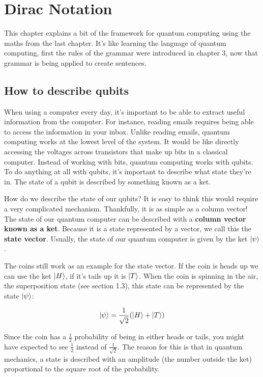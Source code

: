 \chapter{Dirac Notation}

This chapter explains a bit of the framework for quantum computing using the maths from the last chapter. It's like learning the language of quantum computing, first the rules of the grammar were introduced in chapter 3, now that grammar is being applied to create sentences. 

\section{ How to describe qubits}

When using a computer every day, it's important to be able to extract useful information from the computer. For instance, reading emails requires being able to access the information in your inbox. Unlike reading emails, quantum computing works at the lowest level of the system. It would be like directly accessing the voltages across transistors that make up bits in a classical computer. Instead of working with bits, quantum computing works with qubits. To do anything at all with qubits, it's important to describe what state they're in. The state of a qubit is described by something known as a ket. 

How do we describe the state of our qubits? It is easy to think this would require a very complicated mechanism. Thankfully, it is as simple as a column vector! The state of our quantum computer can be described with a \textbf{column vector known as a ket}. Because it is a state represented by a vector, we call this the \textbf{state vector}. Usually, the state of our quantum computer is given by the ket $\ket{\psi}$.

The coins still work as an example for the state vector. If the coin is heads up we can use the ket $\ket{H}$, if it's tails up it is $\ket{T}$. When the coin is spinning in the air, the superposition state (see section 1.3), this state can be represented by the state $\ket{\psi}$: 

$$ \ket{\psi} = \frac{1}{\sqrt{2}}(\ket{H} + \ket{T}) $$

Since the coin has a $\frac{1}{2}$ probability of being in either heads or tails, you might have expected to see $\frac{1}{2}$ instead of $\frac{1}{\sqrt{2}}$. The reason for this is that in quantum mechanics, a state is described with an amplitude (the number outside the ket) proportional to the square root of the probability. 

